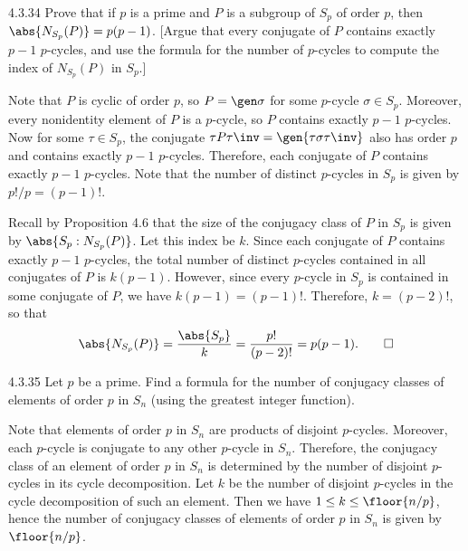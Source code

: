 \begin{exercise}{4.3.34}
	 Prove that if $p$ is a prime and $P$ is a subgroup of $S_p$ of order $p$, then $\abs{N_{S_p}(P)} = p(p - 1)$. [Argue that every conjugate of $P$ contains exactly $p - 1$ $p$-cycles, and use the formula for the number of $p$-cycles to compute the index of $N_{S_p}(P)$ in $S_p$.]
\end{exercise}

\begin{sol}
	Note that $P$ is cyclic of order $p$, so $P = \gen\sigma$ for some $p$-cycle $\sigma \in S_p$.
	Moreover, every nonidentity element of $P$ is a $p$-cycle, so $P$ contains exactly $p - 1$ $p$-cycles.
	Now for some $\tau \in S_p$, the conjugate $\tau P\tau\inv = \gen{\tau\sigma\tau\inv}$ also has order $p$ and contains exactly $p - 1$ $p$-cycles.
	Therefore, each conjugate of $P$ contains exactly $p - 1$ $p$-cycles.
	Note that the number of distinct $p$-cycles in $S_p$ is given by $p!/p = (p - 1)!$.

	Recall by Proposition 4.6 that the size of the conjugacy class of $P$ in $S_p$ is given by $\abs{S_p : N_{S_p}(P)}$.
	Let this index be $k$.
	Since each conjugate of $P$ contains exactly $p - 1$ $p$-cycles, the total number of distinct $p$-cycles contained in all conjugates of $P$ is $k(p - 1)$.
	However, since every $p$-cycle in $S_p$ is contained in some conjugate of $P$, we have $k(p - 1) = (p - 1)!$.
	Therefore, $k = (p - 2)!$, so that
	\[
		\abs{N_{S_p}(P)} = \frac{\abs{S_p}}{k} = \frac{p!}{(p - 2)!} = p(p - 1).\qedhere
	\]
\end{sol}

\begin{exercise}{4.3.35}
	Let $p$ be a prime.
	Find a formula for the number of conjugacy classes of elements of order $p$ in $S_n$ (using the greatest integer function).
\end{exercise}

\begin{sol}
	Note that elements of order $p$ in $S_n$ are products of disjoint $p$-cycles.
	Moreover, each $p$-cycle is conjugate to any other $p$-cycle in $S_n$.
	Therefore, the conjugacy class of an element of order $p$ in $S_n$ is determined by the number of disjoint $p$-cycles in its cycle decomposition.
	Let $k$ be the number of disjoint $p$-cycles in the cycle decomposition of such an element.
	Then we have $1 \leq k \leq \floor{n/p}$, hence the number of conjugacy classes of elements of order $p$ in $S_n$ is given by $\floor{n/p}$.
\end{sol}

